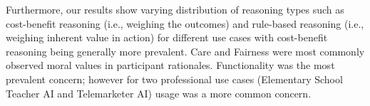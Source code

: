 Furthermore, our results show varying distribution of reasoning types such as cost-benefit reasoning (i.e., weighing the outcomes) and rule-based reasoning (i.e., weighing inherent value in action) for different use cases with cost-benefit reasoning being generally more prevalent. Care and Fairness were most commonly observed moral values in participant rationales. Functionality was the most prevalent concern; however for two professional use cases (Elementary School Teacher AI and Telemarketer AI) usage was a more common concern. 


